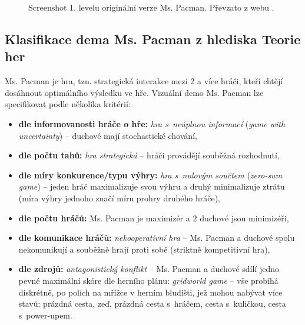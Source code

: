 \begin{figure}[!htbp]
\begin{center}
  \caption[]{Screenshot 1. levelu originální verze Ms. Pacman. Převzato z webu \footnotemark{}.}
  \label{img:mspac}
\end{center}
\end{figure}

\subsection*{Klasifikace dema Ms. Pacman z hlediska Teorie her}
Ms. Pacman je hra, tzn. strategická interakce mezi 2 a více hráči, kteří chtějí dosáhnout optimálního výsledku ve hře.
Vizuální demo Ms. Pacman lze specifikovat podle několika kritérií:
\begin{itemize}
  \item \textbf{dle informovanosti hráče o hře:} \textit{hra s neúplnou informací} (\textit{game with uncertainty}) -- duchové mají stochastické chování,
  \item \textbf{dle počtu tahů:} \textit{hra strategická} – hráči provádějí souběžná rozhodnutí,
  \item \textbf{dle míry konkurence/typu výhry:} \textit{hra s nulovým součtem} (\textit{zero-sum game})  -- jeden hráč maximalizuje svou výhru a druhý minimalizuje ztrátu (míra výhry jednoho značí míru prohry druhého hráče),
  \item \textbf{dle počtu hráčů:} Ms. Pacman je maximizér a 2 duchové jsou minimizéři,
  \item \textbf{dle komunikace hráčů:} \textit{nekooperativní hra} – Ms. Pacman a duchové spolu nekomunikují a souběžně hrají proti sobě (striktně kompetitivní hra),
  \item \textbf{dle zdrojů:} \textit{antagonistický konflikt} – Ms. Pacman a duchové sdílí jedno pevné maximální skóre dle herního plánu: \textit{gridworld game} – vše probíhá diskrétně, po polích na mřížce v herním bludišti, jež mohou nabývat více stavů: prázdná cesta, zeď, prázdná cesta s hráčem, cesta s kuličkou, cesta s power-upem.
\end{itemize}

